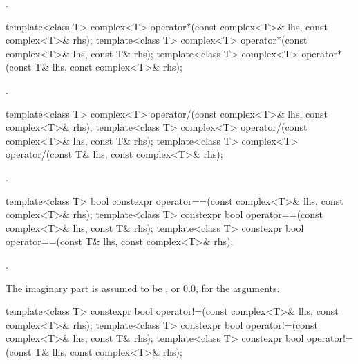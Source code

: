 \begin{itemdescr}
\pnum
\returns
{}.
\end{itemdescr}

%
\begin{itemdecl}
template<class T>
  complex<T> operator*(const complex<T>& lhs, const complex<T>& rhs);
template<class T> complex<T> operator*(const complex<T>& lhs, const T& rhs);
template<class T> complex<T> operator*(const T& lhs, const complex<T>& rhs);
\end{itemdecl}

\begin{itemdescr}
\pnum
\returns
{}.
\end{itemdescr}

%
%
\begin{itemdecl}
template<class T>
  complex<T> operator/(const complex<T>& lhs, const complex<T>& rhs);
template<class T> complex<T> operator/(const complex<T>& lhs, const T& rhs);
template<class T> complex<T> operator/(const T& lhs, const complex<T>& rhs);
\end{itemdecl}

\begin{itemdescr}
\pnum
\returns
{}.
\end{itemdescr}

%
\begin{itemdecl}
template<class T>
  bool constexpr operator==(const complex<T>& lhs, const complex<T>& rhs);
template<class T> constexpr bool operator==(const complex<T>& lhs, const T& rhs);
template<class T> constexpr bool operator==(const T& lhs, const complex<T>& rhs);
\end{itemdecl}

\begin{itemdescr}
\pnum
\returns
{}.

\pnum
\notes
The imaginary part is assumed to be
,
or 0.0, for the
arguments.
\end{itemdescr}

%
\begin{itemdecl}
template<class T>
  constexpr bool operator!=(const complex<T>& lhs, const complex<T>& rhs);
template<class T> constexpr bool operator!=(const complex<T>& lhs, const T& rhs);
template<class T> constexpr bool operator!=(const T& lhs, const complex<T>& rhs);
\end{itemdecl}

